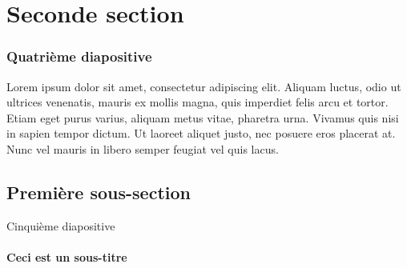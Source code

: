 \section{Seconde section}
\begin{frame}
\frametitle{Quatrième diapositive}

Lorem ipsum dolor sit amet, consectetur adipiscing elit. Aliquam luctus, odio ut ultrices venenatis, mauris ex mollis magna, quis imperdiet felis arcu et tortor. Etiam eget purus varius, aliquam metus vitae, pharetra urna. Vivamus quis nisi in sapien tempor dictum. Ut laoreet aliquet justo, nec posuere eros placerat at. Nunc vel mauris in libero semper feugiat vel quis lacus.

\end{frame}

\subsection{Première sous-section}
\begin{frame}{Cinquième diapositive}
\framesubtitle{Ceci est un sous-titre}

\end{frame}